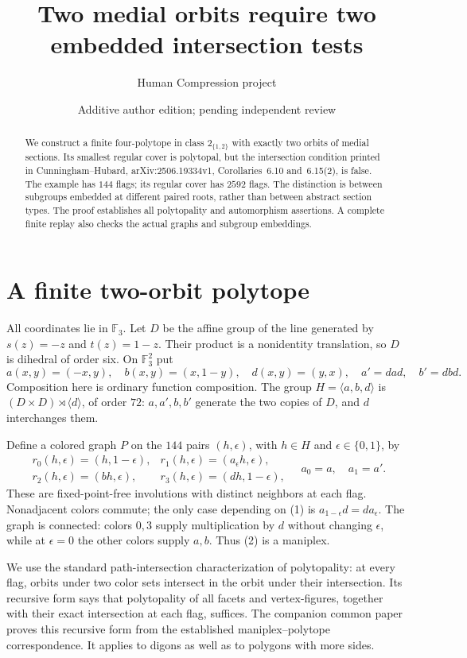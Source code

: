 \documentclass[a4paper,11pt]{article}
\title{Two medial orbits require two embedded intersection tests}
\author{Human Compression project}
\date{Additive author edition; pending independent review}
\newcommand{\gen}[1]{\langle#1\rangle}
\newcommand{\F}{\mathbb F_3}
\begin{document}
\maketitle
\begin{abstract}
We construct a finite four-polytope in class $2_{\{1,2\}}$ with exactly two
orbits of medial sections. Its smallest regular cover is polytopal, but
the intersection condition printed in Cunningham--Hubard,
arXiv:2506.19334v1, Corollaries~6.10 and~6.15(2), is false.
The example has $144$ flags; its regular cover has $2592$ flags.
The distinction is between subgroups embedded at different paired
roots, rather than between abstract section types. The proof establishes
all polytopality and automorphism assertions. A complete finite replay
also checks the actual graphs and subgroup embeddings.
\end{abstract}

\section{A finite two-orbit polytope}
All coordinates lie in $\F$. Let $D$ be the affine group of the line
generated by $s(z)=-z$ and $t(z)=1-z$. Their product is a nonidentity
translation, so $D$ is dihedral of order six. On $\F^2$ put
\[
 a(x,y)=(-x,y),\quad b(x,y)=(x,1-y),\quad d(x,y)=(y,x),
 \quad a'=dad,\quad b'=dbd.                         \tag{1}
\]
Composition here is ordinary function composition.
The group $H=\gen{a,b,d}$ is $(D\times D)\rtimes\gen d$, of order
$72$: $a,a',b,b'$ generate the two copies of $D$, and $d$ interchanges
them.

Define a colored graph $P$ on the $144$ pairs $(h,\epsilon)$, with
$h\in H$ and $\epsilon\in\{0,1\}$, by
\[
\begin{array}{ll}
 r_0(h,\epsilon)=(h,1-\epsilon),&
 r_1(h,\epsilon)=(a_\epsilon h,\epsilon),\\
 r_2(h,\epsilon)=(bh,\epsilon),&
 r_3(h,\epsilon)=(dh,1-\epsilon),
\end{array}
\quad a_0=a,\quad a_1=a'.                           \tag{2}
\]
These are fixed-point-free involutions with distinct neighbors at each
flag. Nonadjacent colors commute; the only case depending on (1) is
$a_{1-\epsilon}d=da_\epsilon$. The graph is connected: colors $0,3$
supply multiplication by $d$ without changing $\epsilon$, while at
$\epsilon=0$ the other colors supply $a,b$. Thus (2) is a maniplex.

We use the standard path-intersection characterization of polytopality:
at every flag, orbits under two color sets intersect in the orbit under
their intersection. Its recursive form says that polytopality of all
facets and vertex-figures, together with their exact intersection at each
flag, suffices. The companion common paper proves this recursive form
from the established maniplex--polytope correspondence. It applies to
digons as well as to polygons with more sides.
\end{document}
